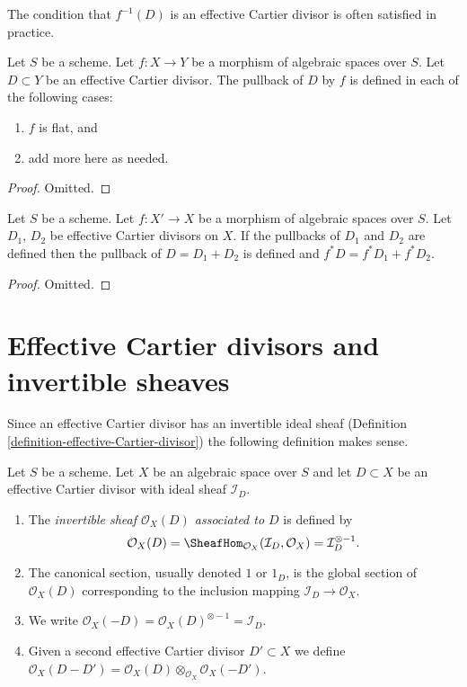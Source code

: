 \noindent
The condition that $f^{-1}(D)$ is an effective Cartier divisor
is often satisfied in practice.

\begin{lemma}
\label{lemma-pullback-effective-Cartier-defined}
Let $S$ be a scheme.
Let $f : X \to Y$ be a morphism of algebraic spaces over $S$.
Let $D \subset Y$ be an effective Cartier divisor.
The pullback of $D$ by $f$ is defined in each of the following cases:
\begin{enumerate}
\item $f$ is flat, and
\item add more here as needed.
\end{enumerate}
\end{lemma}

\begin{proof}
Omitted.
\end{proof}

\begin{lemma}
\label{lemma-pullback-effective-Cartier-divisors-additive}
Let $S$ be a scheme.
Let $f : X' \to X$ be a morphism of algebraic spaces over $S$.
Let $D_1$, $D_2$ be effective Cartier divisors on $X$.
If the pullbacks of $D_1$ and $D_2$ are defined then the
pullback of $D = D_1 + D_2$ is defined and
$f^*D = f^*D_1 + f^*D_2$.
\end{lemma}

\begin{proof}
Omitted.
\end{proof}




\section{Effective Cartier divisors and invertible sheaves}
\label{section-effective-Cartier-invertible}

\noindent
Since an effective Cartier divisor has an invertible ideal sheaf
(Definition \ref{definition-effective-Cartier-divisor}) the
following definition makes sense.

\begin{definition}
\label{definition-invertible-sheaf-effective-Cartier-divisor}
Let $S$ be a scheme. Let $X$ be an algebraic space over $S$
and let $D \subset X$ be an effective Cartier divisor with ideal
sheaf $\mathcal{I}_D$.
\begin{enumerate}
\item The {\it invertible sheaf $\mathcal{O}_X(D)$ associated to $D$}
is defined by
$$
\mathcal{O}_X(D) =
\SheafHom_{\mathcal{O}_X}(\mathcal{I}_D, \mathcal{O}_X) =
\mathcal{I}_D^{\otimes -1}.
$$
\item The canonical section, usually denoted $1$ or $1_D$, is the
global section of $\mathcal{O}_X(D)$ corresponding to
the inclusion mapping $\mathcal{I}_D \to \mathcal{O}_X$.
\item We write
$\mathcal{O}_X(-D) = \mathcal{O}_X(D)^{\otimes -1} = \mathcal{I}_D$.
\item Given a second effective Cartier divisor $D' \subset X$ we define
$\mathcal{O}_X(D - D') =
\mathcal{O}_X(D) \otimes_{\mathcal{O}_X} \mathcal{O}_X(-D')$.
\end{enumerate}
\end{definition}

